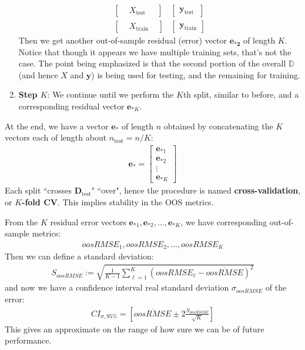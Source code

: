 \documentclass[12pt, a4paper]{article}
\theoremstyle{definition}
\begin{document}
\begin{enumerate}[label=(\alph*)]
\begin{align*}
\begin{bmatrix}
				{} & X_{\text{test\ \ }} & {}
			\end{bmatrix}
			&
			\begin{bmatrix}
				\mathbf{y}_{\text{test\ \ }}
			\end{bmatrix}\\
			\begin{bmatrix}
				{} & X_{\text{train}} & {}
			\end{bmatrix}
			&
			\begin{bmatrix}
				\mathbf{y}_{\text{train}}
			\end{bmatrix}
		\end{align*}
		Then we get another out-of-sample residual (error) vector $\mathbf{e_{*2}}$
		of length $K$. Notice that though it appears we have multiple training sets, that's
		not the case. The point being emphasized is that the second portion of the
		overall $\mathbb{D}$ (and hence $X$ and $\mathbf{y}$) is being used for testing,
		and the remaining for training.
		\item \textbf{Step $K$}: We continue until we perform the $K$th split, similar to before,
		and a corresponding residual vector $\mathbf{e}_{*K}$.
	\end{enumerate}
	At the end, we have a vector $\mathbf{e}_*$ of length $n$ obtained by concatenating the
	$K$ vectors each of length about $n_{\text{test}} = n/K$:
	\begin{align*}
		\mathbf{e}_* = \begin{bmatrix}
			\mathbf{e}_{*1}\\
			\mathbf{e}_{*2}\\
			\vdots\\
			\mathbf{e}_{*K}
		\end{bmatrix}
	\end{align*}
	Each split ``crosses $\mathbf{D}_{\text{test}}$" ``over", hence the procedure is
	named \textbf{cross-validation}, or \textbf{$K$-fold CV}. This implies stability
	in the OOS metrics.
	
	From the $K$ residual error vectors $\mathbf{e}_{*1},\mathbf{e}_{*2},\ldots,\mathbf{e}_{*K}$,
	we have corresponding out-of-sample metrics:
	\begin{align*}
		oosRMSE_1,oosRMSE_2,\ldots,oosRMSE_K
	\end{align*}
	Then we can define a standard deviation:
	\begin{align*}
		S_{oosRMSE}:=\sqrt{\frac{1}{K-1}\sum_{\ell=1}^{K}
			\left(oosRMSE_{\ell} - \overline{oosRMSE}\right)^2}
	\end{align*}
	and now we have a confidence interval real standard deviation $\sigma_{oosRMSE}$
	of the error:
	\begin{align*}
		CI_{\sigma, 95\%}=\left[
		\overline{oosRMSE} \pm 2\frac{S_{oosRMSE}}{\sqrt{K}}
		\right]
	\end{align*}
	This gives an approximate on the range of how sure we can be of future performance.
	\pagebreak
	\printbibliography
\end{document}
